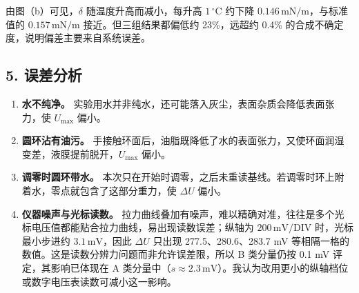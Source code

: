 由图（b）可见，$\delta$ 随温度升高而减小，每升高 $1\,{}^\circ\mathrm{C}$ 约下降 $0.146\,\mathrm{mN/m}$，与标准值的 $0.157\,\mathrm{mN/m}$ 接近。但三组结果都偏低约 23\%，远超约 0.4\% 的合成不确定度，说明偏差主要来自系统误差。

\subsection*{5. 误差分析}

\begin{enumerate}
\item \textbf{水不纯净。} 实验用水并非纯水，还可能落入灰尘，表面杂质会降低表面张力，使 $U_{\max}$ 偏小。
\item \textbf{圆环沾有油污。} 手接触环面后，油脂既降低了水的表面张力，又使环面润湿变差，液膜提前脱开，$U_{\max}$ 偏小。
\item \textbf{调零时圆环带水。} 本次只在开始时调零，之后未重读基线。若调零时环上附着水，零点就包含了这部分重力，使 $\Delta U$ 偏小。
\item \textbf{仪器噪声与光标读数。} 拉力曲线叠加有噪声，难以精确对准，往往是多个光标电压值都能贴合拉力曲线，易出现读数误差；纵轴为 $200\,\mathrm{mV/DIV}$ 时，光标最小步进约 $3.1\,\mathrm{mV}$，因此 $\Delta U$ 只出现 277.5、280.6、283.7 mV 等相隔一格的数值。这是读数分辨力问题而非允许误差限，所以 B 类分量仍按 0.1 mV 评定，其影响已体现在 A 类分量中（$s\approx2.3\,\mathrm{mV}$）。我认为改用更小的纵轴档位或数字电压表读数可减小这一影响。


\end{enumerate}
